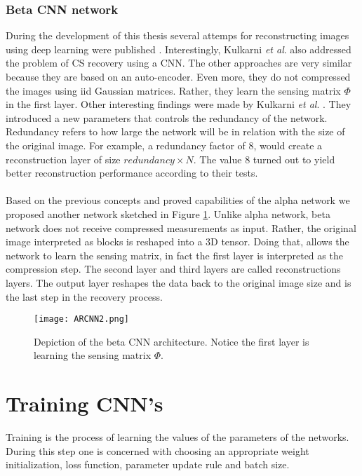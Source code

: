 \subsubsection{Beta CNN network}
During the development of this thesis several attemps for reconstructing images using deep learning were published \cite{kulkarni2016reconnet,mousavi2015deep,iliadis2016deep,iliadis2016deepbinarymask,adler2016deep}. Interestingly, Kulkarni \textit{et al}. \cite{kulkarni2016reconnet} also addressed the problem of CS recovery using a CNN. The other approaches are very similar because they are based on an auto-encoder.  Even more, they do not compressed the images using iid Gaussian matrices. Rather, they learn the sensing matrix $\Phi$ in the first layer. Other interesting findings were made by Kulkarni \textit{et al}. \cite{kulkarni2016reconnet}. They introduced a new parameters that controls the redundancy of the network. Redundancy refers to how large the network will be in relation with the size of the original image. For example, a redundancy factor of 8, would create a reconstruction layer of size $redundancy \times N$. The value 8 turned out to yield better reconstruction performance according to their tests.\\\\
Based on the previous concepts and proved capabilities of the alpha network we proposed another network sketched in Figure \ref{fig:ARCNNim2}. Unlike alpha network, beta network does not receive compressed measurements as input. Rather, the original image interpreted as blocks is reshaped into a 3D tensor. Doing that, allows the network to learn the sensing matrix, in fact the first layer is interpreted as the compression step. The second layer and third layers are called reconstructions layers. The output layer reshapes the data back to the original image size and is the last step in the recovery process.         
\begin{figure}[tb] 
\centering 
\texttt{[image: ARCNN2.png]} 
\caption[Beta CNN architecture for recovery ]{Depiction of the beta CNN architecture. Notice the first layer is learning the sensing matrix $\Phi$.}
\label{fig:ARCNNim2} 
\end{figure}

\section{Training CNN's}
Training is the process of learning the values of the parameters of the networks. During this step one is concerned with choosing an appropriate weight initialization, loss function, parameter update rule and batch size.

